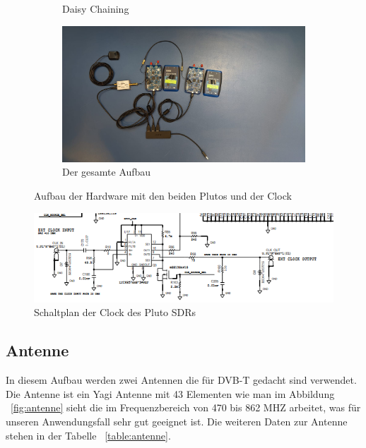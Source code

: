 \begin{figure}
\begin{subfigure}[Daisy Chaining]{0.3\textwidth}
        \caption{Daisy Chaining\\}
    \end{subfigure}
    \begin{subfigure}[Gesamter Aufbau]{0.3\textwidth}
        \includegraphics[width=\textwidth]{images/Pluto_4.jpeg}
        \caption{Der gesamte Aufbau\\}
    \end{subfigure}
    \caption{Aufbau der Hardware mit den beiden Plutos und der Clock} \label{fig:Pluto}
\end{figure}

\begin{figure}
    \centering
    \includegraphics[width=\textwidth]{images/Schaltplan_Clock.png}
    \caption{Schaltplan der Clock des Pluto SDRs} \label{fig:Clock}
\end{figure}

\subsection{Antenne}
In diesem Aufbau werden zwei Antennen die für DVB-T gedacht sind verwendet. Die Antenne ist ein Yagi Antenne mit 43 Elementen wie man im Abbildung ~\ref{fig:antenne} sieht die im Frequenzbereich von 470 bis 862 MHZ arbeitet, was für unseren Anwendungsfall sehr gut geeignet ist. Die weiteren Daten zur Antenne stehen in der Tabelle ~\ref{table:antenne}.

